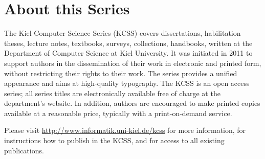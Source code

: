 \chapter*{About this Series}

The Kiel Computer Science Series (KCSS) covers dissertations,
habilitation theses, lecture notes, textbooks, surveys, collections,
handbooks, \etc written at the Department of Computer Science at
Kiel University.  It was initiated in 2011 to
support authors in the dissemination of their work in electronic and
printed form, without restricting their rights to their work. The
series provides a unified appearance and aims at high-quality
typography.  The KCSS is an open access series; all series titles are
electronically available free of charge at the department's website.
In addition, authors are encouraged to make printed copies available
at a reasonable price, typically with a print-on-demand service.
\par
Please visit \url{http://www.informatik.uni-kiel.de/kcss} for more information,
for instructions how to publish in the KCSS,
and for access to all existing publications.
